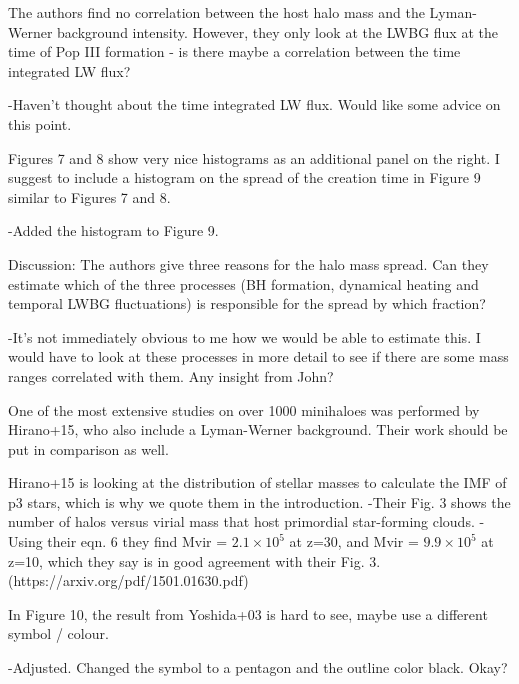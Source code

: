 \documentclass[11pt]{article}
\begin{document}
\begin{referee}
The authors find no correlation between the host halo mass and the Lyman-Werner 
background intensity. However, they only look at the LWBG flux at the time of 
Pop III formation - is there maybe a correlation between the time integrated LW 
flux?
\end{referee}
-Haven't thought about the time integrated LW flux. Would like some advice on this point. 

\begin{referee}
Figures 7 and 8 show very nice histograms as an additional panel on the right. 
I suggest to include a histogram on the spread of the creation time in Figure 9 
similar to Figures 7 and 8.
\end{referee}
-Added the histogram to Figure 9. 

\begin{referee}
Discussion:
The authors give three reasons for the halo mass spread. Can they estimate which
 of the three processes (BH formation, dynamical heating and temporal LWBG 
 fluctuations) is responsible for the spread by which fraction?
\end{referee}
-It's not immediately obvious to me how we would be able to estimate this. I would have to look at these processes in more detail to see if there are some mass ranges correlated with them. Any insight from John?

\begin{referee}
One of the most extensive studies on over 1000 minihaloes was performed by 
Hirano+15, who also include a Lyman-Werner background. Their work should be put 
in comparison as well.
\end{referee}
Hirano+15 is looking at the distribution of stellar masses to calculate the IMF of p3 stars, which is why we quote them in the introduction. 
-Their Fig. 3 shows the number of halos versus virial mass that host primordial star-forming clouds. 
-Using their eqn. 6 they find Mvir = $2.1 \times 10^5$ at z=30, and Mvir = $9.9 \times 10^5$ at z=10, which they say is in good agreement with their Fig. 3. 
(https://arxiv.org/pdf/1501.01630.pdf)

\begin{referee}
In Figure 10, the result from Yoshida+03 is hard to see, maybe use a different 
symbol / colour.
\end{referee}
-Adjusted. Changed the symbol to a pentagon and the outline color black. Okay?
\end{document}
